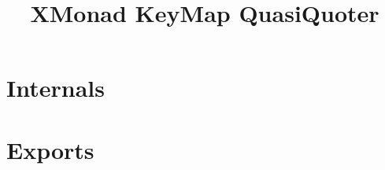 \documentclass{article}
\title{XMonad KeyMap QuasiQuoter}
\begin{document}
\maketitle

\begin{abstract}
\end{abstract}

\tableofcontents

\part{Internals}

\part{Exports}
\end{document}
